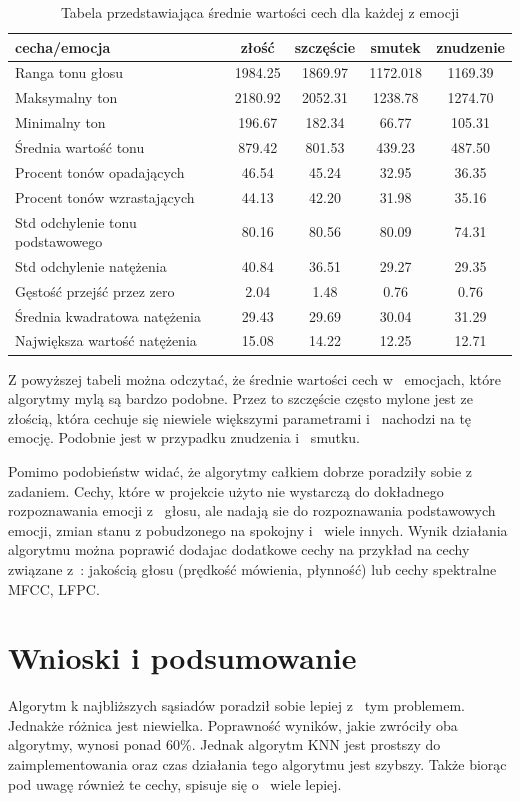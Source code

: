 \documentclass[declaration,shortabstract]{iithesis}
\begin{document}
\begin{table}[p]
\caption{Tabela przedstawiająca średnie wartości cech dla każdej z emocji}
  \begin{tabular}{|l|c|c|c|c|}
    \hline
    cecha/emocja & złość & szczęście & smutek & znudzenie \\ \hline
    Ranga tonu głosu & 1984.25 & 1869.97 & 1172.018 & 1169.39 \\ \hline
    Maksymalny ton & 2180.92 & 2052.31 & 1238.78 & 1274.70\\ \hline
    Minimalny ton & 196.67 & 182.34 & 66.77 & 105.31 \\ \hline
    Średnia wartość tonu & 879.42 & 801.53 & 439.23 & 487.50\\ \hline
	Procent tonów opadających & 46.54 & 45.24 & 32.95 & 36.35 \\ \hline
	Procent tonów wzrastających & 44.13 & 42.20 & 31.98 & 35.16 \\ \hline
	Std odchylenie tonu podstawowego & 80.16 & 80.56 & 80.09 & 74.31 \\ \hline
	Std odchylenie natężenia & 40.84 & 36.51 & 29.27 & 29.35 \\ \hline
	Gęstość przejść przez zero & 2.04 & 1.48 & 0.76 & 0.76 \\ \hline
	Średnia kwadratowa natężenia & 29.43 & 29.69 & 30.04 & 31.29 \\ \hline
	Największa wartość natężenia & 15.08 & 14.22 & 12.25 & 12.71 \\ \hline
  \end{tabular}
  \label{sr_war}
\end{table}

Z powyższej tabeli można odczytać, że średnie wartości cech w~ emocjach, które algorytmy mylą są bardzo podobne. Przez to szczęście często mylone jest ze złością, która cechuje się niewiele większymi parametrami i~ nachodzi na tę emocję. Podobnie jest w przypadku znudzenia i~ smutku. 

Pomimo podobieństw widać, że algorytmy całkiem dobrze poradziły sobie z zadaniem. Cechy, które w projekcie użyto nie wystarczą do dokładnego rozpoznawania emocji z~ głosu, ale nadają sie do rozpoznawania podstawowych emocji, zmian stanu z pobudzonego na spokojny i~ wiele innych. Wynik działania algorytmu można poprawić dodajac dodatkowe cechy na przykład na cechy związane z~: jakością głosu (prędkość mówienia, płynność) lub cechy spektralne MFCC, LFPC. 

\chapter{Wnioski i podsumowanie}
Algorytm k najbliższych sąsiadów poradził sobie lepiej z~ tym problemem. Jednakże różnica jest niewielka. Poprawność wyników, jakie zwróciły oba algorytmy, wynosi ponad 60\%. Jednak algorytm KNN jest prostszy do zaimplementowania oraz czas działania tego algorytmu jest szybszy. Także biorąc pod uwagę również te cechy, spisuje się o~ wiele lepiej.
\end{document}
